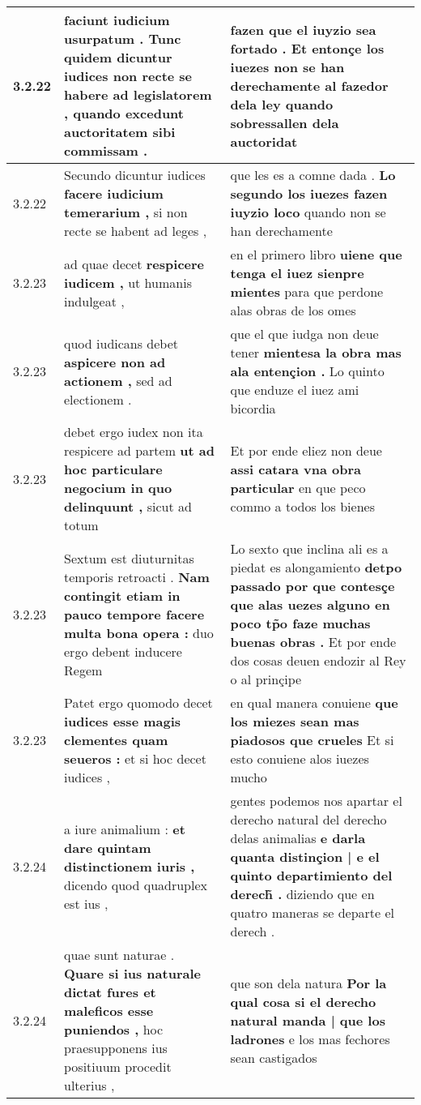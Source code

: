 \begin{tabular}{|p{1cm}|p{6.5cm}|p{6.5cm}|}
3.2.22 & faciunt iudicium usurpatum . \textbf{ Tunc quidem dicuntur iudices non recte se habere ad legislatorem , } quando excedunt auctoritatem sibi commissam . & fazen que el iuyzio sea fortado . \textbf{ Et entonçe los iuezes non se han derechamente al fazedor dela ley } quando sobressallen dela auctoridat \\\hline
3.2.22 & Secundo dicuntur iudices \textbf{ facere iudicium temerarium , } si non recte se habent ad leges , & que les es a comne dada . \textbf{ Lo segundo los iuezes fazen iuyzio loco } quando non se han derechamente \\\hline
3.2.23 & ad quae decet \textbf{ respicere iudicem , } ut humanis indulgeat , & en el primero libro \textbf{ uiene que tenga el iuez sienpre mientes } para que perdone alas obras de los omes \\\hline
3.2.23 & quod iudicans debet \textbf{ aspicere non ad actionem , } sed ad electionem . & que el que iudga non deue tener \textbf{ mientesa la obra mas ala entençion . } Lo quinto que enduze el iuez ami bicordia \\\hline
3.2.23 & debet ergo iudex non ita respicere ad partem \textbf{ ut ad hoc particulare negocium in quo delinquunt , } sicut ad totum & Et por ende eliez non deue \textbf{ assi catara vna obra particular } en que peco commo a todos los bienes \\\hline
3.2.23 & Sextum est diuturnitas temporis retroacti . \textbf{ Nam contingit etiam in pauco tempore facere multa bona opera : } duo ergo debent inducere Regem & Lo sexto que inclina ali es a piedat es alongamiento \textbf{ detpo passado por que contesçe que alas uezes alguno en poco tp̃o faze muchas buenas obras . } Et por ende dos cosas deuen endozir al Rey o al prinçipe \\\hline
3.2.23 & Patet ergo quomodo decet \textbf{ iudices esse magis clementes quam seueros : } et si hoc decet iudices , & en qual manera conuiene \textbf{ que los miezes sean mas piadosos que crueles } Et si esto conuiene alos iuezes mucho \\\hline
3.2.24 & a iure animalium : \textbf{ et dare quintam distinctionem iuris , } dicendo quod quadruplex est ius , & gentes podemos nos apartar el derecho natural del derecho delas animalias \textbf{ e darla quanta distinçion | e el quinto departimiento del derech̃ . } diziendo que en quatro maneras se departe el derech . \\\hline
3.2.24 & quae sunt naturae . \textbf{ Quare si ius naturale dictat fures et maleficos esse puniendos , } hoc praesupponens ius positiuum procedit ulterius , & que son dela natura \textbf{ Por la qual cosa si el derecho natural manda | que los ladrones } e los mas fechores sean castigados \\\hline

\end{tabular}
